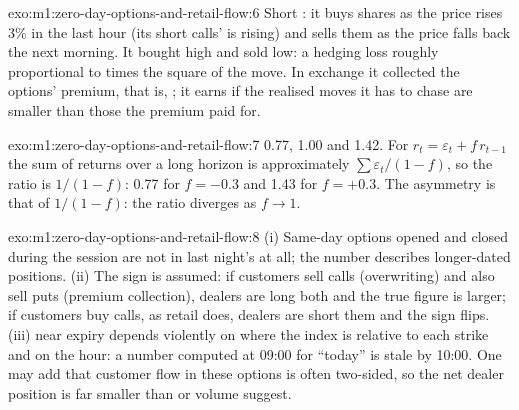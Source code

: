 \begin{solution}{exo:m1:zero-day-options-and-retail-flow:6}
Short : it buys shares as the price rises 3\% in the last hour (its short
calls'  is rising) and sells them as the price falls back the next
morning. It bought high and sold low: a hedging loss roughly proportional to
 times the square of the move. In exchange it collected the options'
premium, that is, ; it earns if the realised moves it has
to chase are smaller than those the premium paid for.
\end{solution}

\begin{solution}{exo:m1:zero-day-options-and-retail-flow:7}
0.77, 1.00 and 1.42. For $r_t = \varepsilon_t + f\,r_{t-1}$ the sum of returns
over a long horizon is approximately $\sum\varepsilon_t/(1-f)$, so the ratio is
$1/(1-f)$: 0.77 for $f = -0.3$ and 1.43 for $f = +0.3$. The asymmetry is that
of $1/(1-f)$: the ratio diverges as $f \to 1$.
\end{solution}

\begin{solution}{exo:m1:zero-day-options-and-retail-flow:8}
(i) Same-day options opened and closed during the session are not in last
night's  at all; the number describes longer-dated positions.
(ii) The sign is assumed: if customers sell calls (overwriting) and also sell
puts (premium collection), dealers are long both and the true figure is
larger; if customers buy calls, as retail does, dealers are short them and
the sign flips. (iii)  near expiry depends violently on where the index
is relative to each strike and on the hour: a number computed at 09:00 for
``today'' is stale by 10:00. One may add that customer flow in these options
is often two-sided, so the net dealer position is far smaller than  or volume suggest.
\end{solution}

